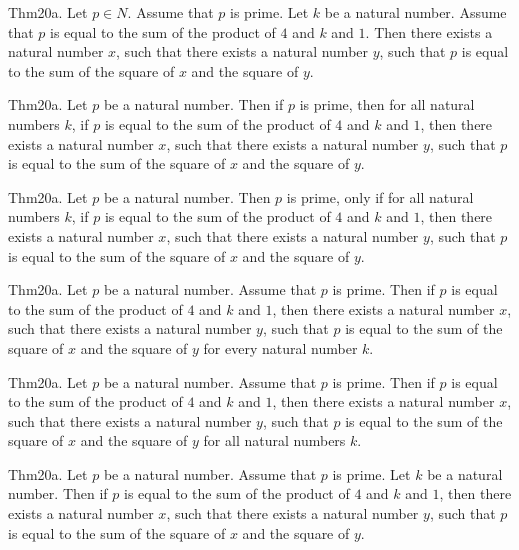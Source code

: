 \documentclass{article}
\begin{document}
Thm20a. Let $p \in N$. Assume that $p$ is prime. Let $k$ be a natural number. Assume that $p$ is equal to the sum of the product of $4$ and $k$ and $1$. Then there exists a natural number $x$, such that there exists a natural number $y$, such that $p$ is equal to the sum of the square of $x$ and the square of $y$.

Thm20a. Let $p$ be a natural number. Then if $p$ is prime, then for all natural numbers $k$, if $p$ is equal to the sum of the product of $4$ and $k$ and $1$, then there exists a natural number $x$, such that there exists a natural number $y$, such that $p$ is equal to the sum of the square of $x$ and the square of $y$.

Thm20a. Let $p$ be a natural number. Then $p$ is prime, only if for all natural numbers $k$, if $p$ is equal to the sum of the product of $4$ and $k$ and $1$, then there exists a natural number $x$, such that there exists a natural number $y$, such that $p$ is equal to the sum of the square of $x$ and the square of $y$.

Thm20a. Let $p$ be a natural number. Assume that $p$ is prime. Then if $p$ is equal to the sum of the product of $4$ and $k$ and $1$, then there exists a natural number $x$, such that there exists a natural number $y$, such that $p$ is equal to the sum of the square of $x$ and the square of $y$ for every natural number $k$.

Thm20a. Let $p$ be a natural number. Assume that $p$ is prime. Then if $p$ is equal to the sum of the product of $4$ and $k$ and $1$, then there exists a natural number $x$, such that there exists a natural number $y$, such that $p$ is equal to the sum of the square of $x$ and the square of $y$ for all natural numbers $k$.

Thm20a. Let $p$ be a natural number. Assume that $p$ is prime. Let $k$ be a natural number. Then if $p$ is equal to the sum of the product of $4$ and $k$ and $1$, then there exists a natural number $x$, such that there exists a natural number $y$, such that $p$ is equal to the sum of the square of $x$ and the square of $y$.
\end{document}
